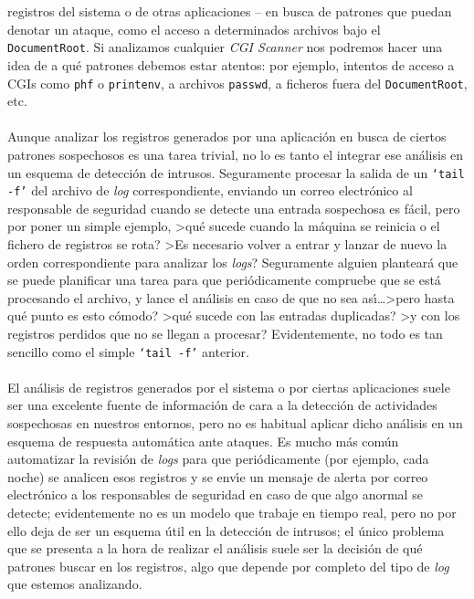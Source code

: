 registros del sistema o de otras aplicaciones -- en busca de patrones que puedan
denotar un ataque, como el acceso a determinados archivos bajo el {\tt 
DocumentRoot}. Si analizamos cualquier {\it CGI Scanner} nos podremos hacer
una idea de a qu\'e patrones debemos estar atentos: por ejemplo, intentos de 
acceso a CGIs como {\tt phf} o {\tt printenv}, a archivos {\tt passwd}, a 
ficheros fuera del {\tt DocumentRoot}, etc.\\
\\Aunque analizar los registros generados por una aplicaci\'on en busca de 
ciertos patrones sospechosos es una tarea trivial, no lo es tanto el integrar
ese an\'alisis en un esquema de detecci\'on de intrusos. Seguramente procesar
la salida de un {\tt `tail -f'} del archivo de {\it log} correspondiente, 
enviando un correo electr\'onico al responsable de seguridad cuando se detecte
una entrada sospechosa es f\'acil, pero por poner un simple ejemplo, >qu\'e 
sucede cuando la m\'aquina se reinicia o el fichero de registros se rota? >Es 
necesario volver a entrar y lanzar de nuevo la orden correspondiente para 
analizar los {\it logs}? Seguramente alguien plantear\'a que se puede 
planificar una tarea para que peri\'odicamente compruebe que se est\'a 
procesando el archivo, y lance el an\'alisis en caso de que no sea 
as\'{\i}\ldots >pero hasta qu\'e punto es esto c\'omodo? >qu\'e sucede con las
entradas duplicadas? >y con los registros perdidos que no se llegan a procesar?
Evidentemente, no todo es tan sencillo como el simple {\tt `tail -f'} 
anterior.\\
\\El an\'alisis de registros generados por el sistema o por ciertas aplicaciones
suele ser una excelente fuente de informaci\'on de cara a la detecci\'on de
actividades sospechosas en nuestros entornos, pero no es habitual aplicar dicho
an\'alisis en un esquema de respuesta autom\'atica ante ataques. Es mucho m\'as
com\'un automatizar la revisi\'on de {\it logs} para que peri\'odicamente (por
ejemplo, cada noche) se analicen esos registros y se env\'{\i}e un mensaje de
alerta por correo electr\'onico a los responsables de seguridad en caso de que
algo anormal se detecte; evidentemente no es un modelo que trabaje en tiempo
real, pero no por ello deja de ser un esquema \'util en la detecci\'on de
intrusos; el \'unico problema que se presenta a la hora de realizar el
an\'alisis suele ser la decisi\'on de qu\'e patrones buscar en los registros,
algo que depende por completo del tipo de {\it log} que estemos analizando.\\
